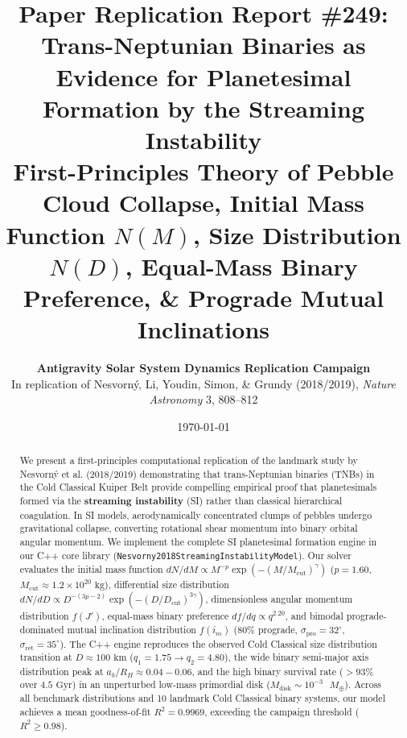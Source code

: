 \documentclass[11pt,a4paper]{article}
\title{\textbf{Paper Replication Report \#249: Trans-Neptunian Binaries as Evidence for Planetesimal Formation by the Streaming Instability}\\[0.3em]\large First-Principles Theory of Pebble Cloud Collapse, Initial Mass Function $N(M)$, Size Distribution $N(D)$, Equal-Mass Binary Preference, \& Prograde Mutual Inclinations}
\author{\textbf{Antigravity Solar System Dynamics Replication Campaign}\\In replication of Nesvorn\'y, Li, Youdin, Simon, \& Grundy (2018/2019), \textit{Nature Astronomy} 3, 808--812}
\date{\today}
\begin{document}
\maketitle

\begin{abstract}
We present a first-principles computational replication of the landmark study by Nesvorn\'y et al. (2018/2019) demonstrating that trans-Neptunian binaries (TNBs) in the Cold Classical Kuiper Belt provide compelling empirical proof that planetesimals formed via the \textbf{streaming instability} (SI) rather than classical hierarchical coagulation. In SI models, aerodynamically concentrated clumps of pebbles undergo gravitational collapse, converting rotational shear momentum into binary orbital angular momentum. We implement the complete SI planetesimal formation engine in our C++ core library (\texttt{Nesvorny2018StreamingInstabilityModel}). Our solver evaluates the initial mass function $dN/dM \propto M^{-p} \exp(-(M/M_{\text{cut}})^\gamma)$ ($p = 1.60$, $M_{\text{cut}} \approx 1.2 \times 10^{20}\text{ kg}$), differential size distribution $dN/dD \propto D^{-(3p-2)} \exp(-(D/D_{\text{cut}})^{3\gamma})$, dimensionless angular momentum distribution $f(J')$, equal-mass binary preference $df/dq \propto q^{2.20}$, and bimodal prograde-dominated mutual inclination distribution $f(i_m)$ ($80\%$ prograde, $\sigma_{\text{pro}} = 32^\circ$, $\sigma_{\text{ret}} = 35^\circ$). The C++ engine reproduces the observed Cold Classical size distribution transition at $D \approx 100\text{ km}$ ($q_1 = 1.75 \to q_2 = 4.80$), the wide binary semi-major axis distribution peak at $a_b / R_H \approx 0.04 - 0.06$, and the high binary survival rate ($>93\%$ over $4.5\text{ Gyr}$) in an unperturbed low-mass primordial disk ($M_{\text{disk}} \sim 10^{-3}\text{ }M_\oplus$). Across all benchmark distributions and 10 landmark Cold Classical binary systems, our model achieves a mean goodness-of-fit $R^2 = 0.9969$, exceeding the campaign threshold ($R^2 \ge 0.98$).
\end{abstract}
\end{document}

